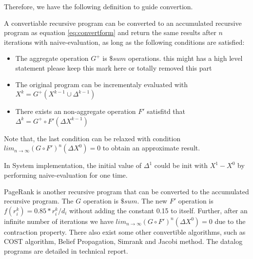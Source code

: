 Therefore, we have the following definition to guide convertion.
\begin{definition}
\label{th:convert}
A convertiable recursive program can be converted to an accumulated recursive program as equation \ref{eq:convertform} and return the same results after $n$ iterations with naive-evaluation, as long as the following conditions are satisfied:
\begin{itemize}
	\item The aggregate operation $G^+$ is $\$sum$ operations.{\color{blue} this  might has a high level statement please keep this mark here or totally removed this part}
	
	\item The original program can be incrementaly evaluated with $X^{k}=G^+(X^{k-1}\cup \Delta^{k-1})$
	\item There exists an non-aggregate operation $F'$ satisfitd that $\Delta^{k}=G^+\circ F'(\Delta X^{k-1})$
	
	
\end{itemize}
\end{definition}
{\color{green}
Note that, the last condition can be relaxed with condition $lim_{n\rightarrow\infty}(G\circ F')^n(\Delta X^0)=0$ to obtain an approximate result.
}


In System implementation, the initial value of $\Delta^1$ could be init with $X^1-X^0$ by performing naive-evaluation for one time.

PageRank is another recursive program that can be converted to the accumulated recursive program. The $G$ operation is $\$sum$. The new $F'$ operation is $f(r_i^k)=0.85*r_i^k/d_i$ without adding the constant 0.15 to itself. Further, after an infinite number of iterations we have $lim_{n\rightarrow\infty}(G\circ F')^n(\Delta X^0)=0$ due to the contraction property. There also exist some other convertible algorithms, such as COST algorithm, Belief Propagation, Simrank and Jacobi method. The datalog programs are detailed in technical report\cite{fullversion}.





